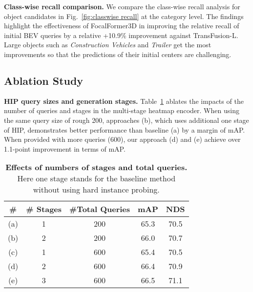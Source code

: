 \documentclass[10pt,twocolumn,letterpaper]{article}
\begin{document}
\vspace{2mm}
\noindent\textbf{Class-wise recall comparison.}
We compare the class-wise recall analysis for object candidates in Fig.~\ref{fig:classwise recall} at the category level. The findings highlight the effectiveness of FocalFormer3D in improving the relative recall of initial BEV queries by a relative +10.9\% improvement against TransFusion-L. Large objects such as \textsl{Construction Vehicles} and \textsl{Trailer} get the most improvements so that the predictions of their initial centers are challenging.

\subsection{Ablation Study}

\vspace{2mm}
\noindent\textbf{HIP query sizes and generation stages.}
Table~\ref{tab: stages comparison} ablates the impacts of the number of queries and stages in the multi-stage heatmap encoder. When using the same query size of rough 200, approaches (b), which uses additional one stage of HIP, demonstrates better performance than baseline (a) by a margin of  mAP. When provided with more queries (600), our approach (d) and (e) achieve over 1.1-point improvement in terms of mAP. 

\begin{table}[bpt]
	\begin{center}
		\begin{tabular}{ccccc}
			\toprule
		\# & \# Stages & \#Total Queries  & mAP & NDS \\ \midrule
            (a) & 1 & 200 & 65.3 & 70.5 \\
            (b) & 2 & 200 & 66.0 & 70.7 \\
            (c) & 1 & 600 & 65.4 & 70.5 \\
            (d) & 2 & 600 & 66.4 & 70.9 \\
            (e) & 3 & 600 & 66.5 & 71.1 \\
			\bottomrule
		\end{tabular}
	\end{center}
	\caption{\textbf{Effects of numbers of stages and total queries.} Here one stage stands for the baseline method without using hard instance probing. } \label{tab: stages comparison}
\end{table}
\end{document}
